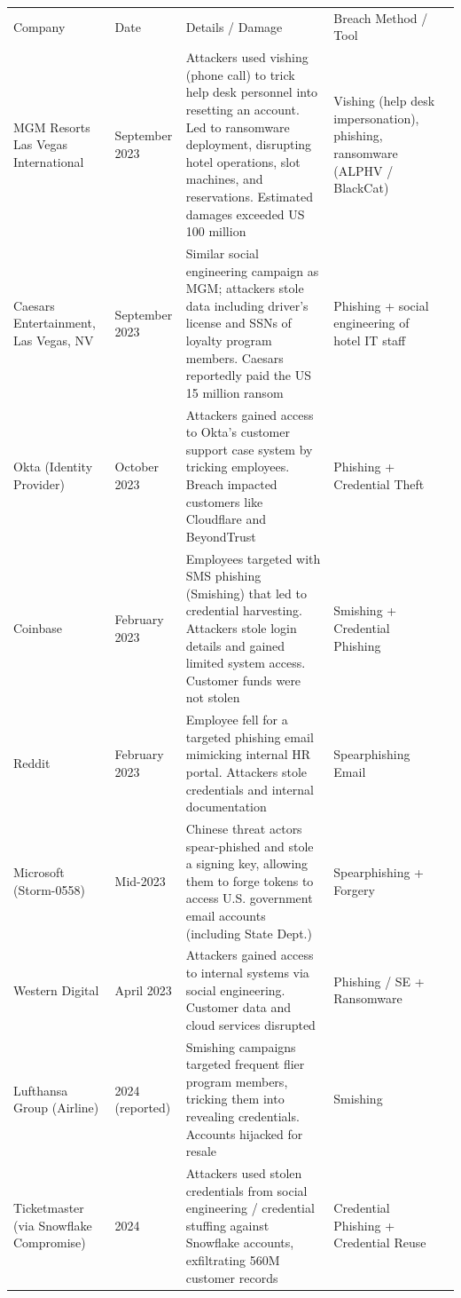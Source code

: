 {\begin{table}
    \centering
    \begin{tabular}{lllll}
         Company&  Date&  Details / Damage& Breach Method / Tool\\
         MGM Resorts Las Vegas International&  September 2023&  Attackers used vishing (phone call) to trick help desk personnel into resetting an account. Led to ransomware deployment, disrupting hotel operations, slot machines, and reservations. Estimated damages exceeded US 100 million& Vishing (help desk impersonation), phishing, ransomware (ALPHV / BlackCat)\\
         Caesars Entertainment, Las Vegas, NV&  September 2023&  Similar social engineering campaign as MGM; attackers stole data including driver's license and SSNs of loyalty program members. Caesars reportedly paid the US 15 million ransom& Phishing + social engineering of hotel IT staff\\
         Okta (Identity Provider)&  October 2023&  Attackers gained access to Okta's customer support case system by tricking employees. Breach impacted customers like Cloudflare and BeyondTrust& Phishing + Credential Theft\\
       Coinbase& February 2023& Employees targeted with SMS phishing (Smishing) that led to credential harvesting. Attackers stole login details and gained limited system access. Customer funds were not stolen& Smishing + Credential Phishing\\
       Reddit& February 2023& Employee fell for a targeted phishing email mimicking internal HR portal. Attackers stole credentials and internal documentation& Spearphishing Email \\
       Microsoft (Storm-0558)& Mid-2023& Chinese threat actors spear-phished and stole a signing key, allowing them to forge tokens to access U.S. government email accounts (including State Dept.)& Spearphishing + Forgery\\
       Western Digital& April 2023& Attackers gained access to internal systems via social engineering. Customer data and cloud services disrupted& Phishing / SE + Ransomware\\
       Lufthansa Group (Airline)& 2024 (reported)& Smishing campaigns targeted frequent flier program members, tricking them into revealing credentials. Accounts hijacked for resale& Smishing\\
       Ticketmaster (via Snowflake Compromise)& 2024& Attackers used stolen credentials from social engineering / credential stuffing against Snowflake accounts, exfiltrating 560M customer records& Credential Phishing + Credential Reuse\\

\end{tabular}
\end{table}}
